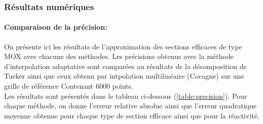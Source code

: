\subsubsection{Résultats numériques}
\paragraph{Comparaison de la précision:\\}
\hspace{0.5cm}
On présente ici les résultats de l'approximation des sections efficaces de type MOX avec chacune des méthodes. Les précisions obtenus avec la méthode d'interpolation adaptative sont comparées au résultats de la décomposition de Tucker ainsi que ceux obtenu par intpolation multilinéaire (Cocagne) sur une grille de référence Contenant $6000$ points.\\
Les résultats sont présentés dans le tableau ci-dessous (\ref{table:precision}). Pour chaque méthode, on donne l'erreur relative absolue ainsi que l'erreur quadratique moyenne obtenue pour chaque type de section efficace ainsi que pour la réactivité.\\
